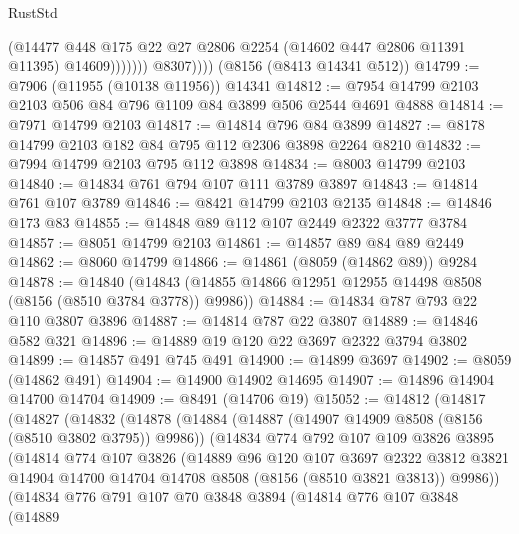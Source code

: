 \begin{lexlean}{RustStd}
\begin{coremodule}
{\begin{coremodule}
{{{{{{{{{{{{{{{{{{{{{{{{{{{{{{{{{{                        (@14477
                          @448
                          @175
                          @22
                          @27
                          @2806
                          @2254
                          (@14602 @447 @2806 @11391 @11395)
                          @14609)))))))
            @8307))))
    (@8156 (@8413 @14341 @512))
@14799 := @7906 (@11955 (@10138 @11956)) @14341
@14812 := @7954 @14799 @2103 @2103 @506 @84 @796 @1109 @84 @3899 @506 @2544 @4691 @4888
@14814 := @7971 @14799 @2103
@14817 := @14814 @796 @84 @3899
@14827 := @8178 @14799 @2103 @182 @84 @795 @112 @2306 @3898 @2264 @8210
@14832 := @7994 @14799 @2103 @795 @112 @3898
@14834 := @8003 @14799 @2103
@14840 := @14834 @761 @794 @107 @111 @3789 @3897
@14843 := @14814 @761 @107 @3789
@14846 := @8421 @14799 @2103 @2135
@14848 := @14846 @173 @83
@14855 := @14848 @89 @112 @107 @2449 @2322 @3777 @3784
@14857 := @8051 @14799 @2103
@14861 := @14857 @89 @84 @89 @2449
@14862 := @8060 @14799
@14866 := @14861 (@8059 (@14862 @89)) @9284
@14878 := @14840
    (@14843 (@14855 @14866 @12951 @12955 @14498 @8508 (@8156 (@8510 @3784 @3778)) @9986))
@14884 := @14834 @787 @793 @22 @110 @3807 @3896
@14887 := @14814 @787 @22 @3807
@14889 := @14846 @582 @321
@14896 := @14889 @19 @120 @22 @3697 @2322 @3794 @3802
@14899 := @14857 @491 @745 @491
@14900 := @14899 @3697
@14902 := @8059 (@14862 @491)
@14904 := @14900 @14902 @14695
@14907 := @14896 @14904 @14700 @14704
@14909 := @8491 (@14706 @19)
@15052 := @14812
    (@14817
      (@14827
        (@14832
          (@14878
            (@14884
              (@14887 (@14907 @14909 @8508 (@8156 (@8510 @3802 @3795)) @9986))
              (@14834
                @774
                @792
                @107
                @109
                @3826
                @3895
                (@14814
                  @774
                  @107
                  @3826
                  (@14889
                    @96
                    @120
                    @107
                    @3697
                    @2322
                    @3812
                    @3821
                    @14904
                    @14700
                    @14704
                    @14708
                    @8508
                    (@8156 (@8510 @3821 @3813))
                    @9986))
                (@14834
                  @776
                  @791
                  @107
                  @70
                  @3848
                  @3894
                  (@14814
                    @776
                    @107
                    @3848
                    (@14889
}}}}}}}}}}}}}}}}}}}}}}}}}}}}}}}}}}
\end{coremodule}}
\end{coremodule}
\end{lexlean}
